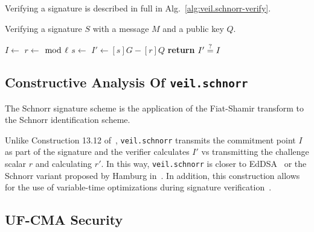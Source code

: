Verifying a signature is described in full in Alg.~\ref{alg:veil.schnorr-verify}.

\begin{algorithm}[!htp]
    \caption{
        Verifying a signature $S$ with a message $M$ and a public key $Q$.
    }
    \begin{algorithmic}
            \State {}
            \State {}
            \State {}
            \State
            \State {}
            \State
            \State $I \gets $ 
            \State $r \gets$  $\bmod~\ell$
            \State
            \State $s \gets $ 
            \State $I' \gets [s]G - [r]Q$
            \State
            \State \textbf{return} $I' \stackrel{?}{=} I$
        \EndFunction
    \end{algorithmic}
    \label{alg:veil.schnorr-verify}
\end{algorithm}

\subsection{Constructive Analysis Of \texttt{veil.schnorr}}\label{subsec:veil.schnorr-analysis}

The Schnorr signature scheme is the application of the Fiat-Shamir transform to the Schnorr identification scheme.

Unlike Construction 13.12 of~\cite[p. 482]{katz2020}, \texttt{veil.schnorr} transmits the commitment point $I$ as part
of the signature and the verifier calculates $I'$ vs transmitting the challenge scalar $r$ and calculating $r'$.
In this way, \texttt{veil.schnorr} is closer to EdDSA~\cite{brendel2021} or the Schnorr variant proposed by Hamburg
in~\cite{hamburg2017}.
In addition, this construction allows for the use of variable-time optimizations during signature
verification~\cite{pornin2020}.

\subsection{UF-CMA Security}\label{subsec:veil.schnorr-uf-cma}

